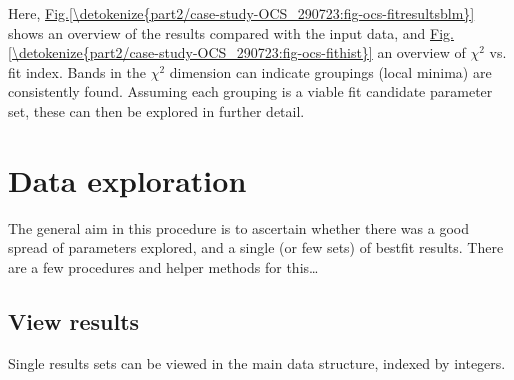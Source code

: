 \documentclass[letterpaper,table,10pt,english]{jupyterBook}
\begin{document}
\sphinxAtStartPar
Here, \hyperref[\detokenize{part2/case-study-OCS_290723:fig-ocs-fitresultsblm}]{Fig.\@ \ref{\detokenize{part2/case-study-OCS_290723:fig-ocs-fitresultsblm}}} shows an overview of the results compared with the input data, and \hyperref[\detokenize{part2/case-study-OCS_290723:fig-ocs-fithist}]{Fig.\@ \ref{\detokenize{part2/case-study-OCS_290723:fig-ocs-fithist}}} an overview of \(\chi^2\) vs. fit index. Bands in the \(\chi^2\) dimension can indicate groupings (local minima) are consistently found. Assuming each grouping is a viable fit candidate parameter set, these can then be explored in further detail.


\section{Data exploration}
\label{\detokenize{part2/case-study-OCS_290723:data-exploration}}
\sphinxAtStartPar
The general aim in this procedure is to ascertain whether there was a good spread of parameters explored, and a single (or few sets) of best\sphinxhyphen{}fit results. There are a few procedures and helper methods for this…


\subsection{View results}
\label{\detokenize{part2/case-study-OCS_290723:view-results}}
\sphinxAtStartPar
Single results sets can be viewed in the main data structure, indexed by integers.
\end{document}
